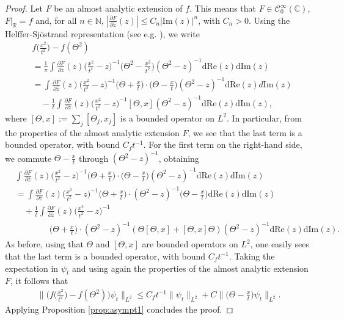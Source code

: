 \documentclass[12pt]{article}
\theoremstyle{plain}
\begin{document}
\begin{proof}
Let $F$ be an almost analytic extension of $f$. This means that $F \in \mathcal{C}_0^\infty(\mathbb{C})$, $F|_{\mathbb{R}}=f$ and, for all $n\in\mathbb{N}$, $|\frac{\partial F}{\partial \bar z}(z)|\le C_n|\mathrm{Im}(z)|^n$, with $C_n>0$. Using the Helffer-Sj\"ostrand representation (see e.g. \cite{derezinski_ger}), we write
\begin{align*}
	&	f\Big(\frac{x^2}{t^2}\Big)-f(\Theta^2)\\
	&=\frac1\pi\int \frac{\partial F}{\partial \bar z}(z) \Big(\frac{x^2}{t^2}-z\Big)^{-1}\Big(\Theta^2-\frac{x^2}{t^2}\Big)(\Theta^2-z)^{-1} \mathrm{d}\mathrm{Re}(z)\mathrm{d}\mathrm{Im}(z) \\
		&=\int \frac{\partial F}{\partial \bar z}(z) \Big(\frac{x^2}{t^2}-z\Big)^{-1}\Big(\Theta+\frac{x}{t}\Big)\cdot\Big(\Theta-\frac{x}{t}\Big)(\Theta^2-z)^{-1} \mathrm{d}\mathrm{Re}(z)d\mathrm{Im}(z)\\
		&\quad-\frac{1}{t}\int \frac{\partial F}{\partial \bar z}(z) \Big(\frac{x^2}{t^2}-z\Big)^{-1}[\Theta,x](\Theta^2-z)^{-1} \mathrm{d}\mathrm{Re}(z)\mathrm{d}\mathrm{Im}(z),
\end{align*}
where $[\Theta,x]:=\sum_j[\Theta_j,x_j]$ is a bounded operator on $L^2$. In particular, from the properties of the almost analytic extension $F$, we see that the last term is a bounded operator, with bound $C_ft^{-1}$. For the first term on the right-hand side, we commute $\Theta-\frac{x}{t}$ through $(\Theta^2-z)^{-1}$, obtaining
\begin{align*}
		&\int \frac{\partial F}{\partial \bar z}(z) \Big(\frac{x^2}{t^2}-z\Big)^{-1}\Big(\Theta+\frac{x}{t}\Big)\cdot\Big(\Theta-\frac{x}{t}\Big)(\Theta^2-z)^{-1} \mathrm{d}\mathrm{Re}(z)\mathrm{d}\mathrm{Im}(z)\\
		&=\int \frac{\partial F}{\partial \bar z}(z) \Big(\frac{x^2}{t^2}-z\Big)^{-1}\Big(\Theta+\frac{x}{t}\Big)\cdot(\Theta^2-z)^{-1}\Big(\Theta-\frac{x}{t}\Big) \mathrm{d}\mathrm{Re}(z)\mathrm{d}\mathrm{Im}(z)\\
		&\quad+\frac{1}{t}\int \frac{\partial F}{\partial \bar z}(z) \Big(\frac{x^2}{t^2}-z\Big)^{-1}\\
		&  \qquad \qquad\Big(\Theta+\frac{x}{t}\Big)\cdot(\Theta^2-z)^{-1}(\Theta[\Theta,x]+[\Theta,x]\Theta)(\Theta^2-z)^{-1} \mathrm{d}\mathrm{Re}(z)\mathrm{d}\mathrm{Im}(z).
\end{align*}
As before, using that $\Theta$ and $[\Theta,x]$ are bounded operators on $L^2$, one easily sees that the last term is a bounded operator, with bound $C_ft^{-1}$. Taking the expectation in $\psi_t$ and using again the properties of the almost analytic extension $F$, it follows that
\begin{align*}
\Big\|\Big(f\Big(\frac{x^2}{t^2}\Big)-f(\Theta^2)\Big)\psi_t\Big\|_{L^2}\le C_f t^{-1} \|\psi_t\|_{L^2} + C\Big\|\Big(\Theta-\frac{x}{t}\Big)\psi_t\Big\|_{L^2}.
\end{align*}
Applying Proposition \ref{prop:asympt1} concludes the proof.
\end{proof}
\end{document}
